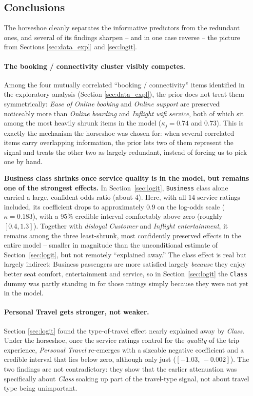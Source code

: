 \subsection{Conclusions}
The horseshoe cleanly separates the informative predictors from the redundant
ones, and several of its findings sharpen -- and in one case reverse -- the
picture from Sections \ref{sec:data_expl} and \ref{sec:logit}.

\paragraph{The booking / connectivity cluster visibly competes.}
Among the four mutually correlated ``booking / connectivity'' items identified in
the exploratory analysis (Section \ref{sec:data_expl}), the prior does not treat
them symmetrically: \textit{Ease of Online booking} and \textit{Online support}
are preserved noticeably more than \textit{Online boarding} and
\textit{Inflight wifi service}, both of which sit among the most heavily shrunk
items in the model ($\kappa_j = 0.74$ and $0.73$). This is exactly the mechanism the horseshoe was chosen for: when
several correlated items carry overlapping information, the prior lets two of them
represent the signal and treats the other two as largely redundant, instead of
forcing us to pick one by hand.

\textbf{Business class shrinks once service quality is in the model, but remains one
of the strongest effects.} In Section~\ref{sec:logit}, \texttt{Business} class alone carried a
large, confident odds ratio (about 4). Here, with all 14 service ratings included,
its coefficient drops to approximately 0.9 on the log-odds scale ($\kappa = 0.183$),
with a 95\% credible interval comfortably above zero (roughly $[0.4, 1.3]$). Together
with \emph{disloyal Customer} and \emph{Inflight entertainment}, it remains among the
three least-shrunk, most confidently preserved effects in the entire model -- smaller
in magnitude than the unconditional estimate of Section~\ref{sec:logit}, but not remotely
``explained away.'' The class effect is real but largely indirect:
Business passengers are more satisfied largely \emph{because} they enjoy better seat
comfort, entertainment and service, so in Section~\ref{sec:logit} the \texttt{Class} dummy was
partly standing in for those ratings simply because they were not yet in the model.

\paragraph{Personal Travel gets stronger, not weaker.}
Section \ref{sec:logit} found the type-of-travel effect nearly explained away by
\textit{Class}. Under the horseshoe, once the service ratings control for the
\emph{quality} of the trip experience, \textit{Personal Travel} re-emerges with a
sizeable negative coefficient and a credible interval that lies below zero,
although only just ($[-1.03,\,-0.002]$). The two findings are not
contradictory: they show that the earlier attenuation was specifically about
\textit{Class} soaking up part of the travel-type signal, not about travel type
being unimportant.

